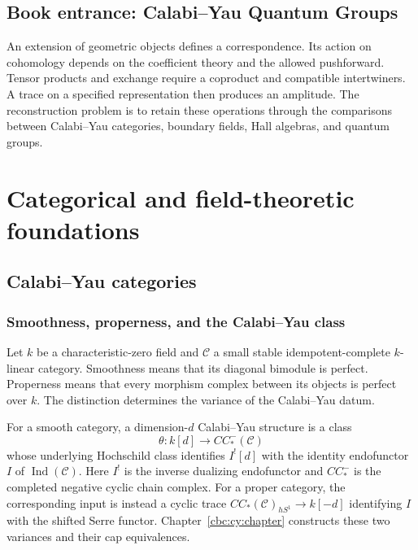 \cleardoublepage
{}
{}
\chapter*{Book entrance: Calabi--Yau Quantum Groups}
\begin{summarybox}
An extension of geometric objects defines a correspondence. Its action on cohomology depends on the coefficient theory and the allowed pushforward. Tensor products and exchange require a coproduct and compatible intertwiners. A trace on a specified representation then produces an amplitude. The reconstruction problem is to retain these operations through the comparisons between Calabi--Yau categories, boundary fields, Hall algebras, and quantum groups.
\end{summarybox}
\part{Categorical and field-theoretic foundations}

\chapter{Calabi--Yau categories}
\section{Smoothness, properness, and the Calabi--Yau class}

Let $k$ be a characteristic-zero field and $\mathcal C$ a small stable idempotent-complete $k$-linear category.
Smoothness means that its diagonal bimodule is perfect.
Properness means that every morphism complex between its objects is perfect over $k$.
The distinction determines the variance of the Calabi--Yau datum.

For a smooth category, a dimension-$d$ Calabi--Yau structure is a class
\[
 \theta:k[d]\longrightarrow CC^-_*(\mathcal C)
\]
whose underlying Hochschild class identifies $I^![d]$ with the identity endofunctor $I$ of $\operatorname{Ind}(\mathcal C)$.
Here $I^!$ is the inverse dualizing endofunctor and $CC^-_*$ is the completed negative cyclic chain complex.
For a proper category, the corresponding input is instead a cyclic trace
$CC_*(\mathcal C)_{hS^1}\to k[-d]$ identifying $I$ with the shifted Serre functor.
Chapter~\ref{cbc:cy:chapter} constructs these two variances and their cap equivalences.

